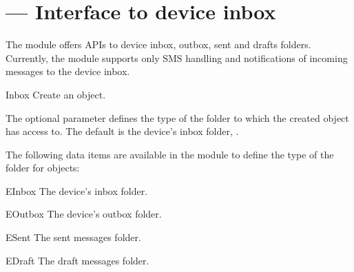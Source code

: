 %
%
%

\section{ ---
   Interface to device inbox}
\label{sec:inbox}


The  module offers APIs to device inbox, outbox, sent and drafts 
folders. Currently, the  module supports only SMS handling and 
notifications of incoming messages to the device inbox.

\begin{classdesc}{Inbox}{}
Create an  object.

The optional parameter  defines the type of the folder to 
which the created  object has access to. The default is the device's 
inbox folder, .
\end{classdesc}

The following data items are available in the  module to define 
the type of the folder for  objects:

\begin{datadesc}{EInbox}
The device's inbox folder.
\end{datadesc}

\begin{datadesc}{EOutbox}
The device's outbox folder.
\end{datadesc}

\begin{datadesc}{ESent}
The sent messages folder.
\end{datadesc}

\begin{datadesc}{EDraft}
The draft messages folder.
\end{datadesc}

